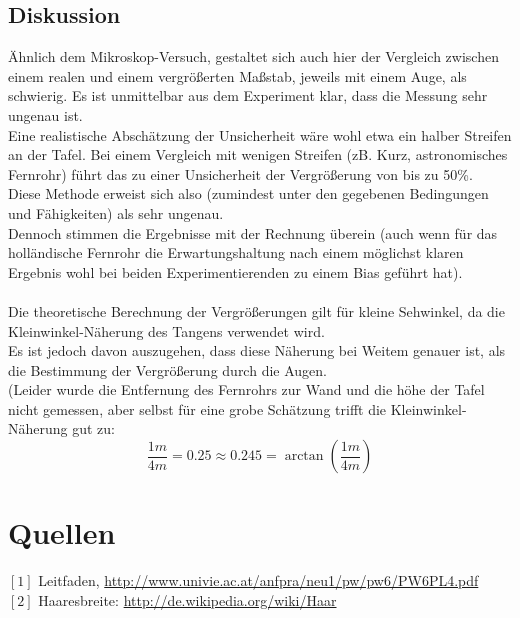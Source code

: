 \documentclass[12pt,a4paper]{article}
\begin{document}
\begin{multicols}{2}
\subsection{Diskussion}

Ähnlich dem Mikroskop-Versuch,  gestaltet sich auch hier der Vergleich zwischen einem realen und einem vergrößerten Maßstab, jeweils mit einem Auge, als schwierig. Es ist unmittelbar aus dem Experiment klar, dass die Messung sehr ungenau ist.\\
Eine realistische Abschätzung der Unsicherheit wäre wohl etwa ein halber Streifen an der Tafel. Bei einem Vergleich mit wenigen Streifen (zB. Kurz, astronomisches Fernrohr) führt das zu einer Unsicherheit der Vergrößerung von bis zu 50\%.\\
Diese Methode erweist sich also (zumindest unter den gegebenen Bedingungen und Fähigkeiten) als sehr ungenau.\\
Dennoch stimmen die Ergebnisse mit der Rechnung überein (auch wenn für das holländische Fernrohr die Erwartungshaltung nach einem möglichst klaren Ergebnis wohl bei beiden Experimentierenden zu einem Bias geführt hat).\\
\\
Die theoretische Berechnung der Vergrößerungen gilt für kleine Sehwinkel, da die Kleinwinkel-Näherung des Tangens verwendet wird.\\
Es ist jedoch davon auszugehen, dass diese Näherung bei Weitem genauer ist, als die Bestimmung der Vergrößerung durch die Augen.\\
(Leider wurde die Entfernung des Fernrohrs zur Wand und die höhe der Tafel nicht gemessen, aber selbst für eine grobe Schätzung trifft die Kleinwinkel-Näherung gut zu:
$$\frac{1m}{4m}=0.25\approx 0.245= \arctan (\frac{1m}{4m})$$

\section{Quellen}
$[1]$ Leitfaden, \url{http://www.univie.ac.at/anfpra/neu1/pw/pw6/PW6PL4.pdf}\\
$[2]$ Haaresbreite: \url{http://de.wikipedia.org/wiki/Haar}

\end{multicols}
\end{document}
